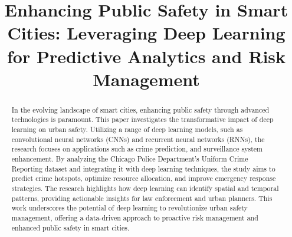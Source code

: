 \documentclass[conference]{IEEEtran}
\begin{document}
\title{Enhancing Public Safety in Smart Cities: Leveraging Deep Learning for Predictive Analytics and Risk Management\\}

\author{



\and
{}
} \maketitle

\begin{abstract} In the evolving landscape of smart cities, enhancing public safety through advanced technologies is paramount. This paper investigates the transformative impact of deep learning on urban safety. Utilizing a range of deep learning models, such as convolutional neural networks (CNNs) and recurrent neural networks (RNNs), the research focuses on applications such as crime prediction, and surveillance system enhancement. By analyzing the Chicago Police Department's Uniform Crime Reporting dataset and integrating it with deep learning techniques, the study aims to predict crime hotspots, optimize resource allocation, and improve emergency response strategies. The research highlights how deep learning can identify spatial and temporal patterns, providing actionable insights for law enforcement and urban planners. This work underscores the potential of deep learning to revolutionize urban safety management, offering a data-driven approach to proactive risk management and enhanced public safety in smart cities.

 \end{abstract}
 
\end{document}
